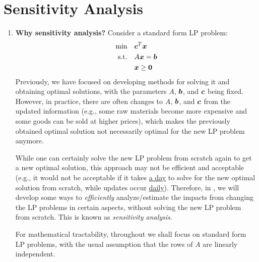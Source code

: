 \section{Sensitivity Analysis}
\label{sect:sens-analysis}
\begin{enumerate}
\item \textbf{Why sensitivity analysis?} Consider a standard form LP problem:
\begin{align*}
\text{min}\quad&\bm{c}^{T}\bm{x} \\
\text{s.t.}\quad&A\bm{x}=\bm{b} \\
&\bm{x}\ge \bm{0}
\end{align*}
Previously, we have focused on developing methods for solving it and obtaining
optimal solutions, with the parameters \(A\), \(\bm{b}\), and \(\bm{c}\)
being fixed. However, in practice, there are often changes to \(A\),
\(\bm{b}\), and \(\bm{c}\) from the updated information (e.g., some raw
materials  become more expensive and some goods 
can be sold at higher prices), which makes the previously obtained optimal
solution not necessarily optimal for the new LP problem anymore.

While one can certainly solve the new LP problem from scratch again to get a
new optimal solution, this approach may not be efficient and acceptable (e.g.,
it would not be acceptable if it takes \underline{a day} to solve for the new optimal
solution from scratch, while updates occur \underline{daily}). Therefore, in
, we will develop some ways to \emph{efficiently}
analyze/estimate the impacts from changing the LP problems in certain aspects,
without solving the new LP problem from scratch. This is known as
\emph{sensitivity analysis}.

For mathematical tractability, throughout we shall focus on standard form LP
problems, with the usual assumption that the rows of \(A\) are linearly
independent.
\end{enumerate}
